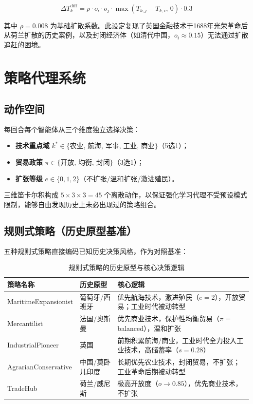 \documentclass[12pt, a4paper]{article}
\begin{document}
\begin{equation}
\Delta T_k^{\text{diff}} = \rho \cdot o_i \cdot o_j \cdot \max(T_{k,j} - T_{k,i},\, 0) \cdot 0.3
\label{eq:diffusion}
\end{equation}

其中 $\rho = 0.008$ 为基础扩散系数。此设定复现了英国金融技术于1688年光荣革命后从荷兰扩散的历史案例，以及封闭经济体（如清代中国，$o_i \approx 0.15$）无法通过扩散追赶的困境。

\section{策略代理系统}

\subsection{动作空间}

每回合每个智能体从三个维度独立选择决策：

\begin{itemize}
    \item \textbf{技术重点域} $k^* \in \{$农业, 航海, 军事, 工业, 商业$\}$（5选1）；
    \item \textbf{贸易政策} $\pi \in \{$开放, 均衡, 封闭$\}$（3选1）；
    \item \textbf{扩张等级} $e \in \{0, 1, 2\}$（不扩张/温和扩张/激进殖民）。
\end{itemize}

三维笛卡尔积构成 $5 \times 3 \times 3 = 45$ 个离散动作，以保证强化学习代理不受预设模式限制，能够自由发现历史上未必出现过的策略组合。

\subsection{规则式策略（历史原型基准）}

五种规则式策略直接编码已知历史决策风格，作为对照基准：

\begin{table}[h]
\centering
\caption{规则式策略的历史原型与核心决策逻辑}
\label{tab:strategies}
\begin{tabular}{lp{3.2cm}p{7cm}}
\toprule
策略名称 & 历史原型 & 核心逻辑 \\
\midrule
MaritimeExpansionist & 葡萄牙/西班牙 & 优先航海技术，激进殖民（$e=2$），开放贸易；工业时代被动转型 \\
Mercantilist         & 法国/奥斯曼   & 优先商业技术，保护性均衡贸易（$\pi=$balanced），温和扩张 \\
IndustrialPioneer    & 英国          & 前期积累航海/商业，工业时代全力投入工业技术，高储蓄率（$s=0.28$）\\
AgrarianConservative & 中国/莫卧儿印度 & 长期优先农业技术，封闭贸易，不扩张；工业革命后期被动转型 \\
TradeHub             & 荷兰/威尼斯   & 极高开放度（$o \to 0.85$），优先商业技术，不扩张 \\
\bottomrule
\end{tabular}
\end{table}
\end{document}
